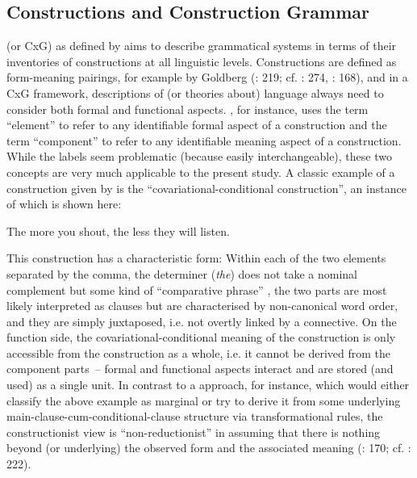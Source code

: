 \subsection{\label{bkm:Ref485630178}Constructions and Construction Grammar}\label{sec:4.1.1}

 (or CxG) as defined by \citet[1]{BergsDiewald2008} aims to describe grammatical systems in terms of their inventories of constructions at all linguistic levels. Constructions are defined as form-meaning pairings, for example by Goldberg (\citeyear{Goldberg2003}: 219; cf. \citealt{Langacker1987,Croft2005}: 274, \citealt{Trousdale2012}: 168), and in a CxG framework, descriptions of (or theories about) language always need to consider both formal and functional aspects. \citet[275]{Croft2005}, for instance, uses the term “element” to refer to any identifiable formal aspect of a construction and the term “component” to refer to any identifiable meaning aspect of a construction. While the labels seem problematic (because easily interchangeable), these two concepts are very much applicable to the present study. A classic example of a construction given by \citet[220]{Goldberg2003} is the “covariational-conditional construction”, an instance of which is shown here:

\ea\label{ex:74}
The more you shout, the less they will listen.
\z

This construction has a characteristic form: Within each of the two elements separated by the comma, the determiner (\textit{the}) does not take a nominal complement but some kind of “comparative phrase” \citep[220]{Goldberg2003}, the two parts are most likely interpreted as clauses but are characterised by non-canonical word order, and they are simply juxtaposed, i.e. not overtly linked by a connective. On the function side, the covariational-conditional meaning of the construction is only accessible from the construction as a whole, i.e. it cannot be derived from the component parts~– formal and functional aspects interact and are stored (and used) as a single unit. In contrast to a  approach, for instance, which would either classify the above example as marginal or try to derive it from some underlying main-clause-cum-conditional-clause structure via transformational rules, the constructionist view is “non-reductionist” in assuming that there is nothing beyond (or underlying) the observed form and the associated meaning (\citealt{Trousdale2012}: 170; cf. \citealt{Goldberg2006}: 222).

